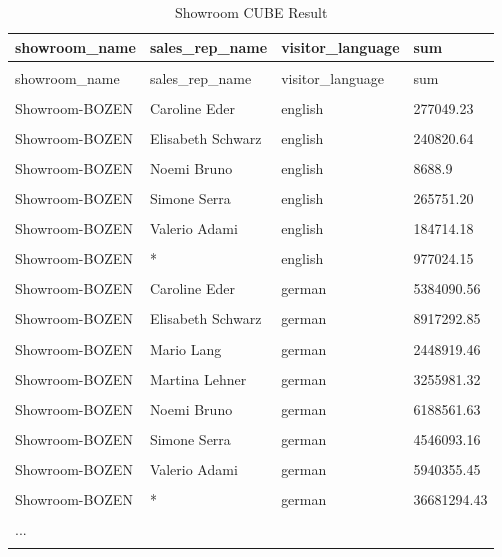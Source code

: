 \documentclass[letterpaper,12pt]{article}
\begin{document}
\begingroup
\renewcommand\arraystretch{0.5}
\begin{longtable}{p{4cm}p{4cm}p{4cm}p{4cm}}
        \caption{Showroom CUBE Result} \\
	showroom\_name & sales\_rep\_name & visitor\_language & sum \\
        \endfirsthead \\
        showroom\_name & sales\_rep\_name & visitor\_language & sum \\
        \endhead \\
        Showroom-BOZEN & Caroline Eder & english & 277049.23 \\
        \hline \\
        Showroom-BOZEN & Elisabeth Schwarz & english & 240820.64 \\
        \hline \\
        Showroom-BOZEN & Noemi Bruno & english & 8688.9 \\
        \hline \\
        Showroom-BOZEN & Simone Serra & english & 265751.20 \\
        \hline \\
        Showroom-BOZEN & Valerio Adami & english & 184714.18 \\
        \hline \\
        Showroom-BOZEN & * & english & 977024.15 \\
        \hline \\
        Showroom-BOZEN & Caroline Eder & german & 5384090.56 \\
        \hline \\
        Showroom-BOZEN & Elisabeth Schwarz & german & 8917292.85 \\
        \hline \\
        Showroom-BOZEN & Mario Lang & german & 2448919.46 \\
        \hline \\
        Showroom-BOZEN & Martina Lehner & german & 3255981.32 \\
        \hline \\
        Showroom-BOZEN & Noemi Bruno & german & 6188561.63 \\
        \hline \\
        Showroom-BOZEN & Simone Serra & german & 4546093.16 \\
        \hline \\
        Showroom-BOZEN & Valerio Adami & german & 5940355.45 \\
        \hline \\
        Showroom-BOZEN & * & german & 36681294.43 \\
        \hline \\
        ... \\
        \hline \\
\end{longtable} 
\endgroup           
\end{document}
